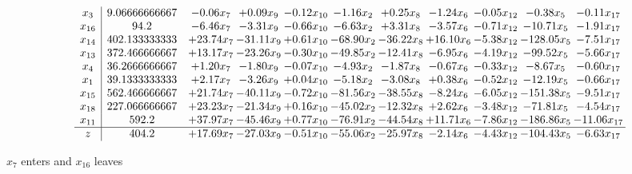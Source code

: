 \documentclass[9pt]{article}
\begin{document}
 \[\begin{array}{c| c c@{\hskip 2pt} c@{\hskip 2pt} c@{\hskip 2pt} c@{\hskip 2pt} c@{\hskip 2pt} c@{\hskip 2pt} c@{\hskip 2pt} c@{\hskip 2pt} c@{\hskip 2pt} }
 x_{3}   &  9.06666666667 & -0.06 x_{7} & +  0.09 x_{9} & -0.12 x_{10} & -1.16 x_{2} & +  0.25 x_{8} & -1.24 x_{6} & -0.05 x_{12} & -0.38 x_{5} & -0.11 x_{17}\\
 x_{16}   &  94.2 & -6.46 x_{7} & -3.31 x_{9} & -0.66 x_{10} & -6.63 x_{2} & +  3.31 x_{8} & -3.57 x_{6} & -0.71 x_{12} & -10.71 x_{5} & -1.91 x_{17}\\
 x_{14}   &  402.133333333 & + 23.74 x_{7} & -31.11 x_{9} & +  0.61 x_{10} & -68.90 x_{2} & -36.22 x_{8} & + 16.10 x_{6} & -5.38 x_{12} & -128.05 x_{5} & -7.51 x_{17}\\
 x_{13}   &  372.466666667 & + 13.17 x_{7} & -23.26 x_{9} & -0.30 x_{10} & -49.85 x_{2} & -12.41 x_{8} & -6.95 x_{6} & -4.19 x_{12} & -99.52 x_{5} & -5.66 x_{17}\\
 x_{4}   &  36.2666666667 & +  1.20 x_{7} & -1.80 x_{9} & -0.07 x_{10} & -4.93 x_{2} & -1.87 x_{8} & -0.67 x_{6} & -0.33 x_{12} & -8.67 x_{5} & -0.60 x_{17}\\
 x_{1}   &  39.1333333333 & +  2.17 x_{7} & -3.26 x_{9} & +  0.04 x_{10} & -5.18 x_{2} & -3.08 x_{8} & +  0.38 x_{6} & -0.52 x_{12} & -12.19 x_{5} & -0.66 x_{17}\\
 x_{15}   &  562.466666667 & + 21.74 x_{7} & -40.11 x_{9} & -0.72 x_{10} & -81.56 x_{2} & -38.55 x_{8} & -8.24 x_{6} & -6.05 x_{12} & -151.38 x_{5} & -9.51 x_{17}\\
 x_{18}   &  227.066666667 & + 23.23 x_{7} & -21.34 x_{9} & +  0.16 x_{10} & -45.02 x_{2} & -12.32 x_{8} & +  2.62 x_{6} & -3.48 x_{12} & -71.81 x_{5} & -4.54 x_{17}\\
 x_{11}   &  592.2 & + 37.97 x_{7} & -45.46 x_{9} & +  0.77 x_{10} & -76.91 x_{2} & -44.54 x_{8} & + 11.71 x_{6} & -7.86 x_{12} & -186.86 x_{5} & -11.06 x_{17}\\
\hline
z    &  404.2 & + 17.69 x_{7} & -27.03 x_{9} & -0.51 x_{10} & -55.06 x_{2} & -25.97 x_{8} & -2.14 x_{6} & -4.43 x_{12} & -104.43 x_{5} & -6.63 x_{17}\\
\end{array}\]


 $ x_{7} $ enters and $ x_{16} $ leaves 
\end{document}
